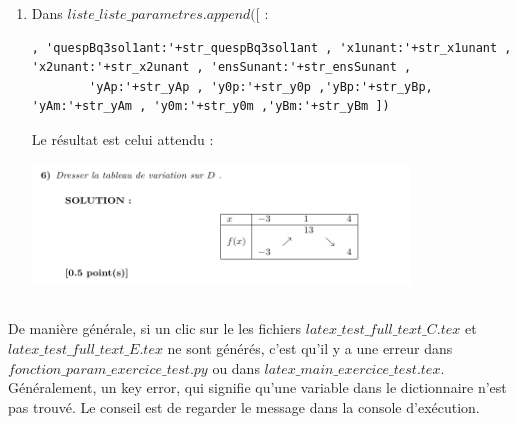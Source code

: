 {\begin{description}
\begin{description}
\begin{enumerate}
\begin{verbatim}
                                            str_yBp = str_yB
                                            str_yAm = ' '
                                            str_y0m = ' '
                                            str_yBm = ' '
                                        else : 
                                            str_yAm = str_yA
                                            str_y0m = str_y0
                                            str_yBm = str_yB
                                            str_yAp = ' '
                                            str_y0p = ' '
                                            str_yBp = ' '

\end{verbatim}
\item Dans $liste\_liste\_parametres.append( [$ : 
\begin{verbatim}
, 'quespBq3sol1ant:'+str_quespBq3sol1ant , 'x1unant:'+str_x1unant , 'x2unant:'+str_x2unant , 'ensSunant:'+str_ensSunant , 
        'yAp:'+str_yAp , 'y0p:'+str_y0p ,'yBp:'+str_yBp,    'yAm:'+str_yAm , 'y0m:'+str_y0m ,'yBm:'+str_yBm ]) 
\end{verbatim}
Le résultat est celui attendu : \\
 \includegraphics[width=10cm,height=4cm]{./images/creation_exercice_solve_erreur_03_correction.png}
  \end{enumerate}

 \end{description}

\end{description}

\begin{remarque}
 De manière générale, si un clic sur le  les fichiers  $latex\_test\_full\_text\_C.tex$ et $latex\_test\_full\_text\_E.tex$ ne sont générés, c'est qu'il y a une erreur dans $fonction\_param\_exercice\_test.py$ ou dans $latex\_main\_exercice\_test.tex$. Généralement, un key error, qui signifie qu'une variable dans le dictionnaire n'est pas trouvé. Le conseil est de regarder le message dans la console d'exécution. 
\end{remarque}

}
